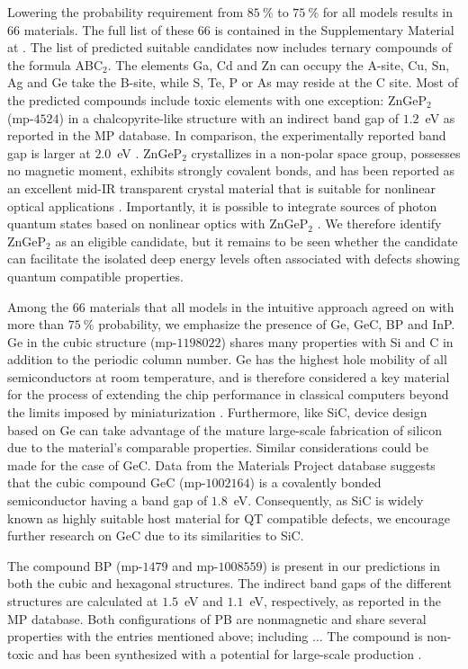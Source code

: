 \documentclass[superscriptaddress,unsortedaddress,
 amsmath,amssymb,
 aps,
]{revtex4-2}
\begin{document}
Lowering the probability requirement from $85 \ \%$ to $75 \ \%$ for all models results in $66$ materials. 
The full list of these $66$ is contained in the Supplementary Material at \cite{supplementary}. 
The list of predicted suitable candidates now includes ternary compounds of the formula ABC$_2$. The elements Ga, Cd and Zn can occupy the A-site, Cu, Sn, Ag and Ge take the B-site, while S, Te, P or As may reside at the C site. Most of the predicted compounds include toxic elements with one exception: ZnGeP$_2$ (mp-$4524$) in a chalcopyrite-like structure with an indirect band gap of $1.2$~eV \cite{Zhang2015} as reported in the MP database. In comparison, the experimentally reported band gap is larger at $2.0$~eV \cite{Xing1989}.
ZnGeP$_2$ crystallizes in a non-polar space group, possesses no magnetic moment, exhibits strongly covalent bonds, and has been reported as an excellent mid-IR transparent crystal material that is suitable for nonlinear optical applications \cite{Zhang2015}. Importantly, it is possible to integrate sources of photon quantum states based on nonlinear optics with ZnGeP$_2$ \cite{Caspani2017}. 
We therefore identify ZnGeP$_2$ as an eligible candidate, but it remains to be seen whether the candidate can facilitate the isolated deep energy levels often associated with defects showing quantum compatible properties.

Among the $66$ materials that all models in the intuitive approach agreed on with more than $75 \ \%$ probability, we emphasize the presence of Ge, GeC, BP and InP. Ge in the cubic structure (mp-$1198022$) shares many properties with Si and C in addition to the periodic column number. 
Ge has the highest hole mobility of all semiconductors at room temperature, and is therefore considered a key material for the process of extending the chip performance in classical computers beyond the limits imposed by miniaturization \cite{Scappucci2020}. Furthermore, like SiC, device design based on Ge can take advantage of the mature large-scale fabrication of silicon due to the material's comparable properties. 
Similar considerations could be made for the case of GeC. 
Data from the Materials Project database suggests that the cubic compound GeC (mp-$1002164$) is a covalently bonded semiconductor having a band gap of $1.8$~eV. 
Consequently, as SiC is widely known as highly suitable host material for QT compatible defects, we encourage further research on GeC due to its similarities to SiC.

The compound BP (mp-$1479$ and mp-$1008559$) is present in our predictions in both the cubic and hexagonal structures. The indirect band gaps of the different structures are calculated at $1.5$~eV and $1.1$~eV, respectively, as reported in the MP database. Both configurations of PB are nonmagnetic and share several properties with the entries mentioned above; including ... The compound is non-toxic and has been synthesized with a potential for large-scale production \cite{MukhanovVladimirA2016Umso}.
\end{document}
